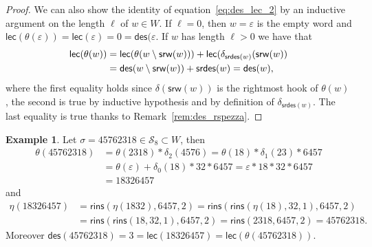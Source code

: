 \documentclass[a4paper]{amsart}
\newcommand{\des}{\mathsf{des}}
\newcommand{\lec}{\mathsf{lec}}
\newcommand{\srw}{\mathsf{srw}}
\newcommand{\rins}{\mathsf{rins}}
\newcommand{\srdes}{\mathsf{srdes}}
\theoremstyle{definition}
\newtheorem{example}[theorem]{Example}
\theoremstyle{remark}
\numberwithin{equation}{section}
\begin{document}
\begin{proof}
We can also show the identity of equation~\eqref{eq:des_lec_2} by an inductive argument on the length $\ell$ of $w\in W$. If $\ell=0$, then $w=\varepsilon$ is the empty word and $\lec(\theta(\varepsilon))=\lec(\varepsilon)=0=\des(\varepsilon$. If $w$ has length $\ell>0$ we have that
\begin{align}
    \lec(\theta(w))&=\lec(\theta(w\setminus\srw(w)))+\lec(\delta_{\srdes(w)}(\srw(w))\notag\\
    &=\des(w\setminus\srw(w))+\srdes(w)=\des(w),
\end{align}
where the first equality holds since $\delta(\srw(w))$ is the rightmost hook of $\theta(w)$, the second is true by inductive hypothesis and by definition of $\delta_{\srdes(w)}$. The last equality is true thanks to Remark~\ref{rem:des_rspezza}.
\end{proof}

\begin{example}
Let $\sigma=45762318\in \mathcal{S}_8\subset W$, then
\begin{align*}
    \theta(45762318)&=\theta(2318)*\delta_2(4576)=\theta(18)*\delta_1(23)*6457\\
    &=\theta(\varepsilon)+\delta_0(18)*32*6457=\varepsilon*18*32*6457 \\
    &=18326457
\end{align*}
and 
\begin{align*}
    \eta(18326457)&=\rins(\eta(1832),6457,2)=\rins(\rins(\eta(18),32,1),6457,2)\\
    &=\rins(\rins(18,32,1),6457,2)=\rins(2318,6457,2)=45762318.
\end{align*}
Moreover $\des(45762318)=3=\lec(18326457)=\lec(\theta(45762318))$.
\end{example}
\end{document}
